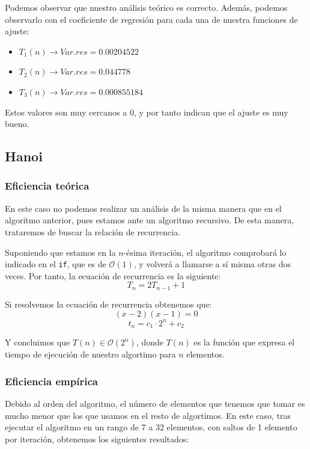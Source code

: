 \documentclass[10pt,a4paper]{article}
\begin{document}
Podemos observar que nuestro análisis teórico es correcto. Además, podemos observarlo con el coeficiente de regresión para cada una de nuestra funciones de ajuste:
\begin{itemize}
	\item \(T_1(n) \longrightarrow Var.res = 0.00204522\)
	\item \(T_2(n) \longrightarrow Var.res = 0.044778\)
	\item \(T_3(n) \longrightarrow Var.res = 0.000855184\)
\end{itemize}

Estos valores son muy cercanos a 0, y por tanto indican que el ajuste es muy bueno.
\subsection{Hanoi}


\subsubsection{Eficiencia teórica}

En este caso no podemos realizar un análisis de la misma manera que en el algoritmo anterior, pues estamos ante un algoritmo recursivo. De esta manera, trataremos de buscar la relación de recurrencia.

Suponiendo que estamos en la \(n\)-ésima iteración, el algoritmo comprobará lo indicado en el \texttt{if}, que es de \(\mathcal{O}(1)\), y volverá a llamarse a sí misma otras dos veces. Por tanto, la ecuación de recurrencia es la siguiente:
\[
	T_n = 2T_{n-1} + 1
\]

Si resolvemos la ecuación de recurrencia obtenemos que:
\[
	(x-2)(x-1) = 0
\]
\[
	t_n = c_1 \cdot 2^n + c_2
\]

Y concluimos que \(T(n) \in \mathcal{O}(2^n)\), donde \(T(n)\) es la función que expresa el tiempo de ejecución de nuestro algortimo para \(n\) elementos.

\subsubsection{Eficiencia empírica}
Debido al orden del algoritmo, el número de elementos que tenemos que tomar es mucho menor que los que usamos en el resto de algortimos. En este caso, tras ejecutar el algoritmo en un rango de 7 a 32 elementos, con saltos de 1 elemento por iteración, obtenemos los siguientes resultados:
\end{document}
